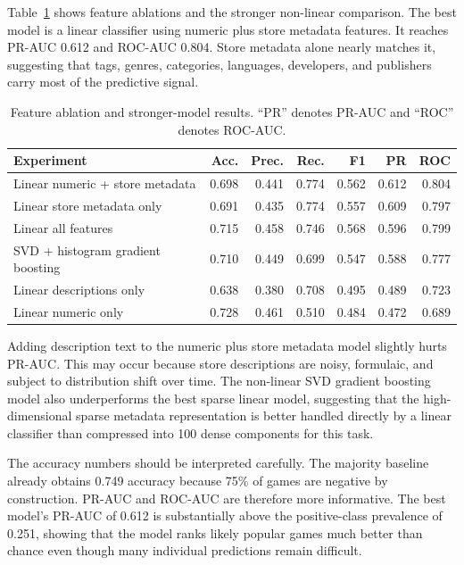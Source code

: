 \documentclass[11pt,sigconf,nonacm]{acmart}
\begin{document}
Table~\ref{tab:ablations} shows feature ablations and the stronger non-linear comparison. The best model is a linear classifier using numeric plus store metadata features. It reaches PR-AUC 0.612 and ROC-AUC 0.804. Store metadata alone nearly matches it, suggesting that tags, genres, categories, languages, developers, and publishers carry most of the predictive signal.

\begin{table}[t]
\centering
\caption{Feature ablation and stronger-model results. ``PR'' denotes PR-AUC and ``ROC'' denotes ROC-AUC.}
\label{tab:ablations}
\small
\begin{tabular}{lrrrrrr}
\toprule
Experiment & Acc. & Prec. & Rec. & F1 & PR & ROC \\
\midrule
Linear numeric + store metadata & 0.698 & 0.441 & 0.774 & 0.562 & 0.612 & 0.804 \\
Linear store metadata only & 0.691 & 0.435 & 0.774 & 0.557 & 0.609 & 0.797 \\
Linear all features & 0.715 & 0.458 & 0.746 & 0.568 & 0.596 & 0.799 \\
SVD + histogram gradient boosting & 0.710 & 0.449 & 0.699 & 0.547 & 0.588 & 0.777 \\
Linear descriptions only & 0.638 & 0.380 & 0.708 & 0.495 & 0.489 & 0.723 \\
Linear numeric only & 0.728 & 0.461 & 0.510 & 0.484 & 0.472 & 0.689 \\
\bottomrule
\end{tabular}
\end{table}

Adding description text to the numeric plus store metadata model slightly hurts PR-AUC. This may occur because store descriptions are noisy, formulaic, and subject to distribution shift over time. The non-linear SVD gradient boosting model also underperforms the best sparse linear model, suggesting that the high-dimensional sparse metadata representation is better handled directly by a linear classifier than compressed into 100 dense components for this task.

The accuracy numbers should be interpreted carefully. The majority baseline already obtains 0.749 accuracy because 75\% of games are negative by construction. PR-AUC and ROC-AUC are therefore more informative. The best model's PR-AUC of 0.612 is substantially above the positive-class prevalence of 0.251, showing that the model ranks likely popular games much better than chance even though many individual predictions remain difficult.
\end{document}
